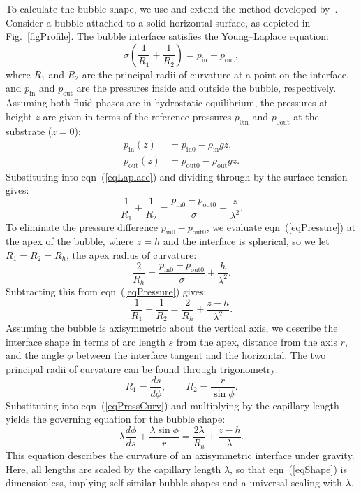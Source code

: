 \documentclass[9pt]{extarticle}
\begin{document}
To calculate the bubble shape, we use and extend the method developed by~\citet{fritz35berechnung}. Consider a bubble attached to a solid horizontal surface, as depicted in Fig.~\ref{figProfile}. The bubble interface satisfies the Young--Laplace equation\cite{degennes04capillarity}:
\begin{equation}\label{eqLaplace}
\sigma \left( \frac{1}{R_1} + \frac{1}{R_2} \right) = p_\mathrm{in} - p_\mathrm{out},
\end{equation}
where $R_1$ and $R_2$ are the principal radii of curvature at a point on the interface, and $p_\mathrm{in}$ and $p_\mathrm{out}$ are the pressures inside and outside the bubble, respectively. Assuming both fluid phases are in hydrostatic equilibrium, the pressures at height $z$ are given in terms of the reference pressures $p_{0\mathrm{in}}$ and $p_{0\mathrm{out}}$ at the substrate ($z=0$):
\begin{align}
p_\mathrm{in}(z)  &= p_\mathrm{in0}  - \rho_\mathrm{in} g z, \\
p_\mathrm{out}(z) &= p_\mathrm{out0} - \rho_\mathrm{out} g z.
\end{align}
Substituting into eqn~(\ref{eqLaplace}) and dividing through by the surface tension gives:
\begin{equation}\label{eqPressure}
  \frac{1}{R_1} + \frac{1}{R_2} = \frac{p_\mathrm{in0} - p_\mathrm{out0}}{\sigma} + \frac{z}{\lambda^2}.
\end{equation}
To eliminate the pressure difference $p_\mathrm{in0} - p_\mathrm{out0}$, we evaluate eqn~(\ref{eqPressure}) at the apex of the bubble, where $z = h$ and the interface is spherical, so we let $R_1 = R_2 = R_h$, the apex radius of curvature:
\begin{equation}
\frac{2}{R_h} = \frac{p_\mathrm{in0} - p_\mathrm{out0}}{\sigma} + \frac{h}{\lambda^2}.
\end{equation}
Subtracting this from eqn~(\ref{eqPressure}) gives:
\begin{equation}\label{eqPressCurv}
\frac{1}{R_1} + \frac{1}{R_2} = \frac{2}{R_h} + \frac{z - h}{\lambda^2}.
\end{equation}
Assuming the bubble is axisymmetric about the vertical axis, we describe the interface shape in terms of arc length $s$ from the apex, distance from the axis $r$, and the angle $\phi$ between the interface tangent and the horizontal. The two principal radii of curvature can be found through trigonometry\cite{bashforth83attempt}:
\begin{equation}
R_1 = \frac{ds}{d\phi}, \qquad R_2 = \frac{r}{\sin\phi}.
\end{equation}
Substituting into eqn~(\ref{eqPressCurv}) and multiplying by the capillary length yields the governing equation for the bubble shape:
\begin{equation}\label{eqShape}
\lambda\frac{d\phi}{ds} + \frac{\lambda\sin\phi}{r} = \frac{2\lambda}{R_h} + \frac{z - h}{\lambda}.
\end{equation}
This equation describes the curvature of an axisymmetric interface under gravity. Here, all lengths are scaled by the capillary length $\lambda$, so that eqn~(\ref{eqShape}) is dimensionless, implying self-similar bubble shapes and a universal scaling with $\lambda$.
\end{document}
